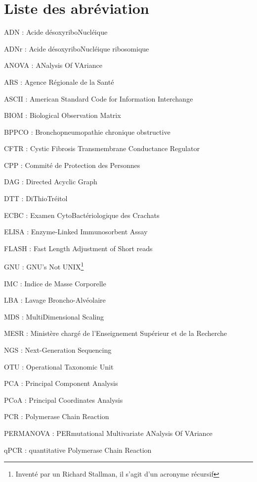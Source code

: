 \documentclass[12pt,a4paper]{article}
\begin{document}
\section*{Liste des abréviation}

\begin{description}[leftmargin=*]
\item ADN : Acide désoxyriboNucléique
\item ADNr : Acide désoxyriboNucléique ribosomique
\item ANOVA : ANalysis Of VAriance
\item ARS : Agence Régionale de la Santé 
\item ASCII : American Standard Code for Information Interchange
\item BIOM :  Biological Observation Matrix 
\item BPPCO : Bronchopneumopathie chronique obstructive
\item CFTR : Cystic Fibrosis Transmembrane Conductance Regulator
\item CPP : Commité de Protection des Personnes
\item DAG : Directed Acyclic Graph
\item DTT : DiThioTréitol
\item ECBC : Examen CytoBactériologique des Crachats
\item ELISA : Enzyme-Linked Immunosorbent Assay
\item FLASH : Fast Length Adjustment of Short reads
\item GNU : GNU’s Not UNIX\footnote{Inventé par un  Richard Stallman, il s'agit d'un acronyme récursif}
\item IMC : Indice de Masse Corporelle
\item LBA :  Lavage Broncho-Alvéolaire
\item MDS : MultiDimensional Scaling
\item MESR : Ministère chargé de l'Enseignement Supérieur et de la Recherche
\item NGS : Next-Generation Sequencing
\item OTU : Operational Taxonomic Unit
\item PCA : Principal Component Analysis
\item PCoA : Principal Coordinates Analysis
\item PCR : Polymerase Chain Reaction
\item PERMANOVA : PERmutational Multivariate ANalysis Of VAriance
\item qPCR : quantitative Polymerase Chain Reaction

\end{description}
\end{document}
